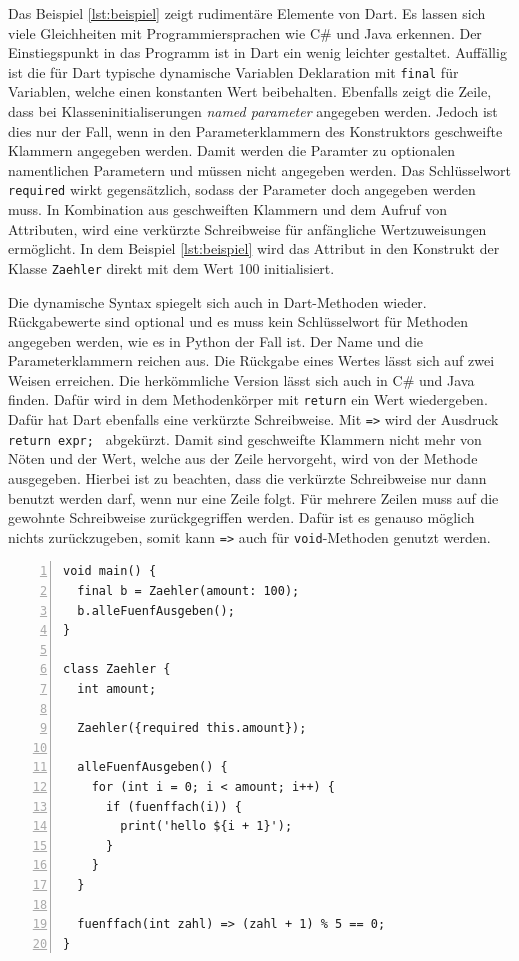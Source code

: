 Das Beispiel \ref{lst:beispiel} zeigt rudimentäre Elemente von Dart. Es lassen sich viele Gleichheiten mit Programmiersprachen wie C\# und Java erkennen. Der Einstiegspunkt in das Programm ist in Dart ein wenig leichter gestaltet. Auffällig ist die für Dart typische dynamische Variablen Deklaration mit \texttt{final} für Variablen, welche einen konstanten Wert beibehalten. Ebenfalls zeigt die Zeile, dass bei Klasseninitialiserungen \textit{named parameter} angegeben werden. Jedoch ist dies nur der Fall, wenn in den Parameterklammern des Konstruktors geschweifte Klammern angegeben werden. Damit werden die Paramter zu optionalen namentlichen Parametern und müssen nicht angegeben werden. Das Schlüsselwort \texttt{required} wirkt gegensätzlich, sodass der Parameter doch angegeben werden muss. In Kombination aus geschweiften Klammern und dem Aufruf von Attributen, wird eine verkürzte Schreibweise für anfängliche Wertzuweisungen ermöglicht. In dem Beispiel \ref{lst:beispiel} wird das Attribut in den Konstrukt der Klasse \texttt{Zaehler} direkt mit dem Wert 100 initialisiert.

Die dynamische Syntax spiegelt sich auch in Dart-Methoden wieder. Rückgabewerte sind optional und es muss kein Schlüsselwort für Methoden angegeben werden, wie es in Python der Fall ist. Der Name und die Parameterklammern reichen aus. Die Rückgabe eines Wertes lässt sich auf zwei Weisen erreichen. Die herkömmliche Version lässt sich auch in C\# und Java finden. Dafür wird in dem Methodenkörper mit \texttt{return} ein Wert wiedergeben. Dafür hat Dart ebenfalls eine verkürzte Schreibweise. Mit \texttt{=>} wird der Ausdruck \texttt{{ return expr; }} abgekürzt. Damit sind geschweifte Klammern nicht mehr von Nöten und der Wert, welche aus der Zeile hervorgeht, wird von der Methode ausgegeben. Hierbei ist zu beachten, dass die verkürzte Schreibweise nur dann benutzt werden darf, wenn nur eine Zeile folgt. Für mehrere Zeilen muss auf die gewohnte Schreibweise zurückgegriffen werden. Dafür ist es genauso möglich nichts zurückzugeben, somit kann \texttt{=>} auch für \texttt{void}-Methoden genutzt werden.

\begin{lstlisting}[caption={Dart Beispiel},captionpos=b,label={lst:beispiel},numbers=left,frame=none,escapechar=|]
void main() {
  final b = Zaehler(amount: 100);
  b.alleFuenfAusgeben();
}

class Zaehler {
  int amount;

  Zaehler({required this.amount});

  alleFuenfAusgeben() {
    for (int i = 0; i < amount; i++) {
      if (fuenffach(i)) {
        print('hello ${i + 1}');
      }
    }
  }

  fuenffach(int zahl) => (zahl + 1) % 5 == 0;
}
\end{lstlisting}

